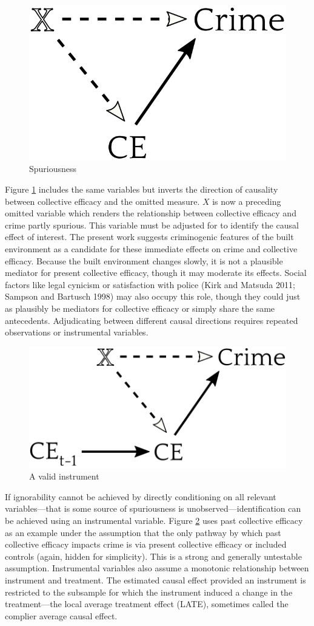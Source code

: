 \documentclass [11pt, proquest] {uwthesis}[2015/03/03]
\begin{document}
\begin{figure}

{\centering \includegraphics[width=0.4\linewidth]{./figure/appendix/2_spuriousness} 

}

\caption{Spuriousness}\label{fig:dag2}
\end{figure}
Figure \ref{fig:dag2} includes the same variables but inverts the direction of causality between collective efficacy and the omitted measure. \(X\) is now a preceding omitted variable which renders the relationship between collective efficacy and crime partly spurious. This variable must be adjusted for to identify the causal effect of interest. The present work suggests criminogenic features of the built environment as a candidate for these immediate effects on crime and collective efficacy. Because the built environment changes slowly, it is not a plausible mediator for present collective efficacy, though it may moderate its effects. Social factors like legal cynicism or satisfaction with police (Kirk and Matsuda 2011; Sampson and Bartusch 1998) may also occupy this role, though they could just as plausibly be mediators for collective efficacy or simply share the same antecedents. Adjudicating between different causal directions requires repeated observations or instrumental variables.
\begin{figure}

{\centering \includegraphics[width=0.5\linewidth]{./figure/appendix/3_instrument} 

}

\caption{A valid instrument}\label{fig:dag3}
\end{figure}
If ignorability cannot be achieved by directly conditioning on all relevant variables---that is some source of spuriousness is unobserved---identification can be achieved using an instrumental variable. Figure \ref{fig:dag3} uses past collective efficacy as an example under the assumption that the only pathway by which past collective efficacy impacts crime is via present collective efficacy or included controls (again, hidden for simplicity). This is a strong and generally untestable assumption. Instrumental variables also assume a monotonic relationship between instrument and treatment. The estimated causal effect provided an instrument is restricted to the subsample for which the instrument induced a change in the treatment---the local average treatment effect (LATE), sometimes called the complier average causal effect.
\end{document}
